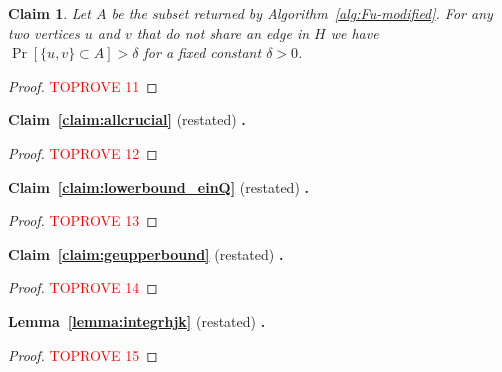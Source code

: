 \documentclass[letterpaper,11pt]{article}
\newtheorem{claim}[lemma]{Claim}
\newcommand{\restateclaim}[2]{\noindent \textbf{Claim~#1} (restated) \textbf{.} {\em #2}}
\newcommand{\restatelem}[2]{\noindent \textbf{Lemma~#1} (restated) \textbf{.} {\em #2}}
\begin{document}
\begin{claim}
    \label{claim:bothalive} Let $A$ be the subset returned by Algorithm~\ref{alg:Fu-modified}.  For any two vertices $u$ and $v$ that do not share an edge in $H$ we have $\Pr[\{u, v\}\subset A]>\delta$ for a fixed constant $\delta > 0$.
\end{claim}
\begin{proof}\textcolor{red}{TOPROVE 11}\end{proof}


\restateclaim{\ref{claim:allcrucial}}{\claimallcrucial{}}
\begin{proof}\textcolor{red}{TOPROVE 12}\end{proof}




\restateclaim{\ref{claim:lowerbound_einQ}}{\claimlowerboundeinQ{}}
\begin{proof}\textcolor{red}{TOPROVE 13}\end{proof}


\restateclaim{\ref{claim:geupperbound}}{\claimgeupperbound{}}

\begin{proof}\textcolor{red}{TOPROVE 14}\end{proof}


\restatelem{\ref{lemma:integrhjk}}{\lemmaintegrhjk{}}

\begin{proof}\textcolor{red}{TOPROVE 15}\end{proof} 

\appendix






\end{document}
